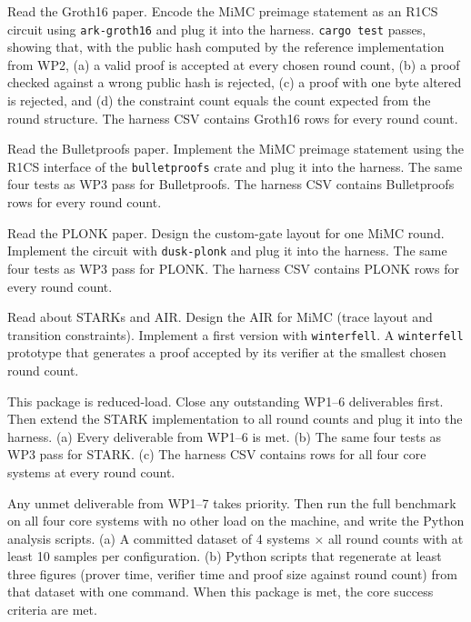 \documentclass[11pt,a4paper]{article}
\begin{document}
{Read the Groth16 paper. Encode the MiMC preimage statement as an R1CS circuit using \texttt{ark-groth16} and plug it into the harness.}
{\texttt{cargo test} passes, showing that, with the public hash computed by the reference implementation from WP2, (a) a valid proof is accepted at every chosen round count, (b) a proof checked against a wrong public hash is rejected, (c) a proof with one byte altered is rejected, and (d) the constraint count equals the count expected from the round structure. The harness CSV contains Groth16 rows for every round count.}

{Read the Bulletproofs paper. Implement the MiMC preimage statement using the R1CS interface of the \texttt{bulletproofs} crate and plug it into the harness.}
{The same four tests as WP3 pass for Bulletproofs. The harness CSV contains Bulletproofs rows for every round count.}

{Read the PLONK paper. Design the custom-gate layout for one MiMC round. Implement the circuit with \texttt{dusk-plonk} and plug it into the harness.}
{The same four tests as WP3 pass for PLONK. The harness CSV contains PLONK rows for every round count.}

{Read about STARKs and AIR. Design the AIR for MiMC (trace layout and transition constraints). Implement a first version with \texttt{winterfell}.}
{A \texttt{winterfell} prototype that generates a proof accepted by its verifier at the smallest chosen round count.}

{This package is reduced-load. Close any outstanding WP1--6 deliverables first. Then extend the STARK implementation to all round counts and plug it into the harness.}
{(a) Every deliverable from WP1--6 is met. (b) The same four tests as WP3 pass for STARK. (c) The harness CSV contains rows for all four core systems at every round count.}

{Any unmet deliverable from WP1--7 takes priority. Then run the full benchmark on all four core systems with no other load on the machine, and write the Python analysis scripts.}
{(a) A committed dataset of 4 systems $\times$ all round counts with at least 10 samples per configuration. (b) Python scripts that regenerate at least three figures (prover time, verifier time and proof size against round count) from that dataset with one command. When this package is met, the core success criteria are met.}
\end{document}
